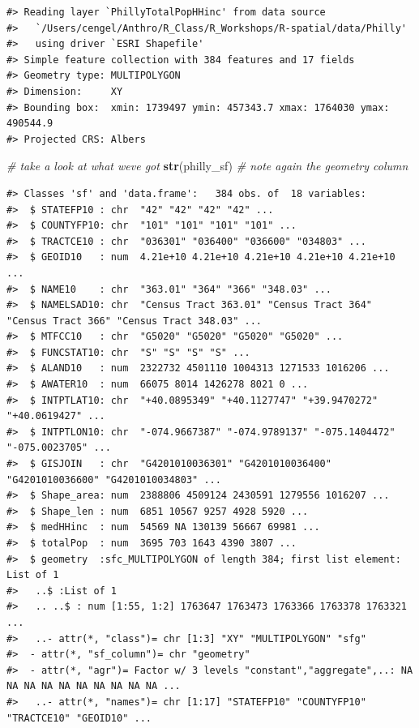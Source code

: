 \documentclass[
]{book}
\newenvironment{Shaded}{\begin{snugshade}}{\end{snugshade}}
\newcommand{\CommentTok}[1]{\textcolor[rgb]{0.56,0.35,0.01}{\textit{#1}}}
\newcommand{\FunctionTok}[1]{\textcolor[rgb]{0.13,0.29,0.53}{\textbf{#1}}}
\newcommand{\NormalTok}[1]{#1}
\begin{document}
\begin{verbatim}
#> Reading layer `PhillyTotalPopHHinc' from data source 
#>   `/Users/cengel/Anthro/R_Class/R_Workshops/R-spatial/data/Philly' 
#>   using driver `ESRI Shapefile'
#> Simple feature collection with 384 features and 17 fields
#> Geometry type: MULTIPOLYGON
#> Dimension:     XY
#> Bounding box:  xmin: 1739497 ymin: 457343.7 xmax: 1764030 ymax: 490544.9
#> Projected CRS: Albers
\end{verbatim}

\begin{Shaded}
\begin{Highlighting}[]
\CommentTok{\# take a look at what we\textquotesingle{}ve got}
\FunctionTok{str}\NormalTok{(philly\_sf) }\CommentTok{\# note again the geometry column}
\end{Highlighting}
\end{Shaded}

\begin{verbatim}
#> Classes 'sf' and 'data.frame':   384 obs. of  18 variables:
#>  $ STATEFP10 : chr  "42" "42" "42" "42" ...
#>  $ COUNTYFP10: chr  "101" "101" "101" "101" ...
#>  $ TRACTCE10 : chr  "036301" "036400" "036600" "034803" ...
#>  $ GEOID10   : num  4.21e+10 4.21e+10 4.21e+10 4.21e+10 4.21e+10 ...
#>  $ NAME10    : chr  "363.01" "364" "366" "348.03" ...
#>  $ NAMELSAD10: chr  "Census Tract 363.01" "Census Tract 364" "Census Tract 366" "Census Tract 348.03" ...
#>  $ MTFCC10   : chr  "G5020" "G5020" "G5020" "G5020" ...
#>  $ FUNCSTAT10: chr  "S" "S" "S" "S" ...
#>  $ ALAND10   : num  2322732 4501110 1004313 1271533 1016206 ...
#>  $ AWATER10  : num  66075 8014 1426278 8021 0 ...
#>  $ INTPTLAT10: chr  "+40.0895349" "+40.1127747" "+39.9470272" "+40.0619427" ...
#>  $ INTPTLON10: chr  "-074.9667387" "-074.9789137" "-075.1404472" "-075.0023705" ...
#>  $ GISJOIN   : chr  "G4201010036301" "G4201010036400" "G4201010036600" "G4201010034803" ...
#>  $ Shape_area: num  2388806 4509124 2430591 1279556 1016207 ...
#>  $ Shape_len : num  6851 10567 9257 4928 5920 ...
#>  $ medHHinc  : num  54569 NA 130139 56667 69981 ...
#>  $ totalPop  : num  3695 703 1643 4390 3807 ...
#>  $ geometry  :sfc_MULTIPOLYGON of length 384; first list element: List of 1
#>   ..$ :List of 1
#>   .. ..$ : num [1:55, 1:2] 1763647 1763473 1763366 1763378 1763321 ...
#>   ..- attr(*, "class")= chr [1:3] "XY" "MULTIPOLYGON" "sfg"
#>  - attr(*, "sf_column")= chr "geometry"
#>  - attr(*, "agr")= Factor w/ 3 levels "constant","aggregate",..: NA NA NA NA NA NA NA NA NA NA ...
#>   ..- attr(*, "names")= chr [1:17] "STATEFP10" "COUNTYFP10" "TRACTCE10" "GEOID10" ...
\end{verbatim}
\end{document}
